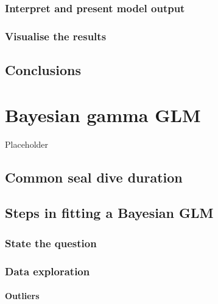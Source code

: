 \documentclass[
]{book}
\begin{document}
\hypertarget{bern-present}{%
\subsection{Interpret and present model output}\label{bern-present}}

\hypertarget{visualise-the-results-3}{%
\subsection{Visualise the results}\label{visualise-the-results-3}}

\hypertarget{conclusions-4}{%
\section{Conclusions}\label{conclusions-4}}

\hypertarget{gamma-glm}{%
\chapter{Bayesian gamma GLM}\label{gamma-glm}}

Placeholder

\hypertarget{common-seal-dive-duration}{%
\section{Common seal dive duration}\label{common-seal-dive-duration}}

\hypertarget{gamma-glm-steps}{%
\section{Steps in fitting a Bayesian GLM}\label{gamma-glm-steps}}

\hypertarget{seal-question}{%
\subsection{State the question}\label{seal-question}}

\hypertarget{gamma-eda}{%
\subsection{Data exploration}\label{gamma-eda}}

\hypertarget{outliers-2}{%
\subsubsection{Outliers}\label{outliers-2}}
\end{document}
